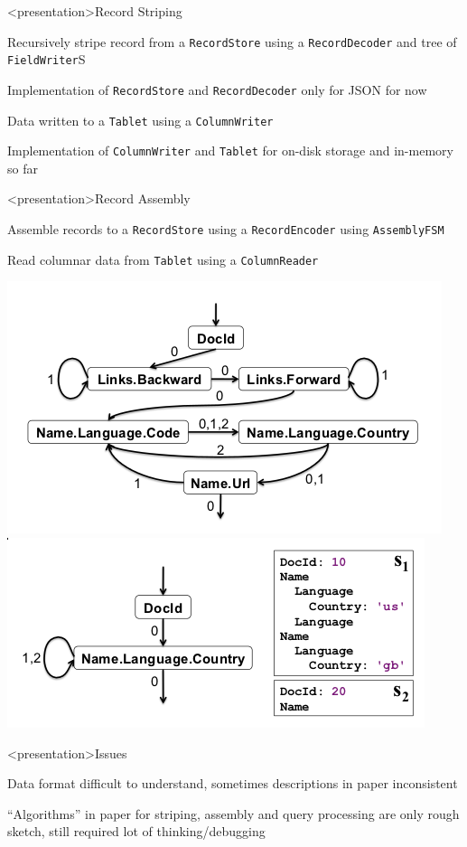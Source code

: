 \begin{frame}<presentation>{Record Striping}
\begin{niitemize}
 \item Recursively stripe record from a \texttt{RecordStore} using a
  \texttt{RecordDecoder} and tree of \texttt{FieldWriter}S
 \item Implementation of \texttt{RecordStore} and \texttt{RecordDecoder} only
  for JSON for now
 \item Data written to a \texttt{Tablet} using a \texttt{ColumnWriter}
 \item Implementation of \texttt{ColumnWriter} and \texttt{Tablet} for on-disk
  storage and in-memory so far
\end{niitemize}
\end{frame}

\begin{frame}<presentation>{Record Assembly}
\begin{niitemize}
 \item Assemble records to a \texttt{RecordStore} using a
  \texttt{RecordEncoder} using \texttt{AssemblyFSM}
 \item Read columnar data from \texttt{Tablet} using a \texttt{ColumnReader}
\end{niitemize}

\includegraphics[width=.49\textwidth]{gfx/full-assemblyfsm}
\hfill
\includegraphics[width=.49\textwidth]{gfx/partial-assemblyfsm}
\end{frame}

\begin{frame}<presentation>{Issues}
\begin{niitemize}
 \item Data format difficult to understand, sometimes descriptions
  in paper inconsistent
 \item ``Algorithms'' in paper for striping, assembly and query processing are only
  rough sketch, still required lot of
  thinking/debugging
\end{niitemize}
\end{frame}


